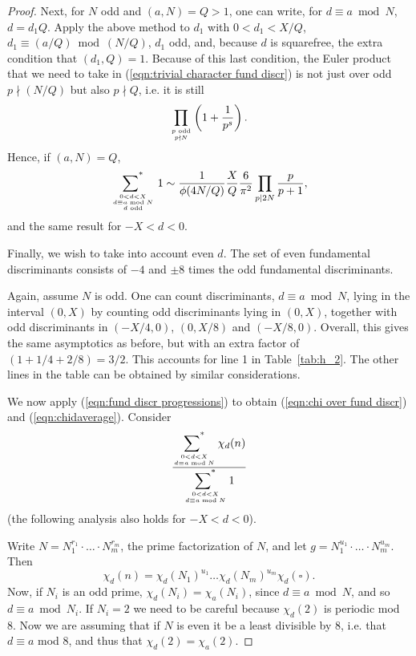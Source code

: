 \documentclass[12pt,letterpaper]{amsart}
\theoremstyle{plain}
\theoremstyle{definition}
\theoremstyle{remark}
\numberwithin{equation}{subsection}
\numberwithin{theorem}{subsection}
\numberwithin{table}{subsection}
\newcommand{\ontop}[2]{\genfrac{}{}{0pt}{}{#1}{#2}}
\def\sumstar{\operatornamewithlimits{\sum\nolimits^*}}
\begin{document}
\begin{proof}
Next, for $N$ odd and $(a,N)=Q>1$, one can write, for $d \equiv a \bmod N$,  $d=d_1 Q$.
Apply the above method to $d_1$ with $0 < d_1 < X/Q$, $d_1 \equiv (a/Q) \bmod (N/Q)$, $d_1$ odd,
and, because $d$ is squarefree, the extra condition that $(d_1,Q)=1$. 
Because of this last condition, the Euler product 
that we need to take in (\ref{eqn:trivial character fund discr}) is not just over
odd $p \nmid (N/Q)$ but also $p \nmid Q$, i.e. it is still 
\begin{equation}
    \prod_{\ontop{\text{$p$ odd}}{p \nmid N}} \left( 1+\frac{1}{p^s}\right).
\end{equation}
Hence, if $(a,N)= Q$,
\begin{equation}
    \sumstar_{\ontop{0 < d < X}{\ontop{d \equiv a \bmod N}{\text{$d$ odd}}}} 1
    \sim \frac{1}{\phi(4N/Q)} \frac{X}{Q} \frac{6}{\pi^2}
    \prod_{p|2N} \frac{p}{p+1},
\end{equation}
and the same result for $-X < d < 0$. 

Finally, we wish to take into account even $d$. The set of even fundamental discriminants
consists of $-4$ and $\pm 8$ times the odd fundamental discriminants. 

Again, assume $N$ is odd.
One can count discriminants, $d \equiv a \bmod N$, lying in the interval $(0,X)$
by counting odd discriminants lying in $(0,X)$, together with odd discriminants in $(-X/4,0)$,
$(0,X/8)$ and $(-X/8,0)$. Overall, this gives the same asymptotics as before, but with an extra
factor of $(1+1/4+2/8)=3/2$. This accounts for line 1 in Table~\ref{tab:h_2}. The other lines
in the table can be obtained by similar considerations.

We now apply (\ref{eqn:fund discr progressions}) to obtain (\ref{eqn:chi over fund discr})
and (\ref{eqn:chidaverage}). Consider
\begin{equation}
\label{eqn:fund discr progr kronecker ratio}
    \frac{\displaystyle
        \sumstar_{\ontop{0 < d < X}{d \equiv a \bmod N}} \chi_d(n)
    }
    {\displaystyle
        \sumstar_{\ontop{0 < d < X}{d \equiv a \bmod N}} 1
    }
\end{equation}
(the following analysis also holds for $-X < d <0$).

Write $N=N_1^{r_1}\cdot\ldots\cdot N_m^{r_m}$, the prime factorization of $N$,
and let $g=N_1^{u_1}\cdot\ldots\cdot N_m^{u_m}$. Then
\begin{equation}
    \chi_d(n) = \chi_d(N_1)^{u_1} \ldots \chi_d(N_m)^{u_m} \chi_d( \square).
\end{equation}
Now, if $N_i$ is an odd prime, $\chi_d(N_i) = \chi_a(N_i)$, since $d \equiv a \bmod N$, and so
$d \equiv a \bmod N_i$. If $N_i=2$ we need to be careful because $\chi_d(2)$ is
periodic mod 8. Now we are assuming that 
if $N$ is even it be a least divisible by 8, i.e. that $d \equiv a$ mod $8$,
and thus that $\chi_d(2) = \chi_a(2)$. 


\end{proof}
\end{document}
